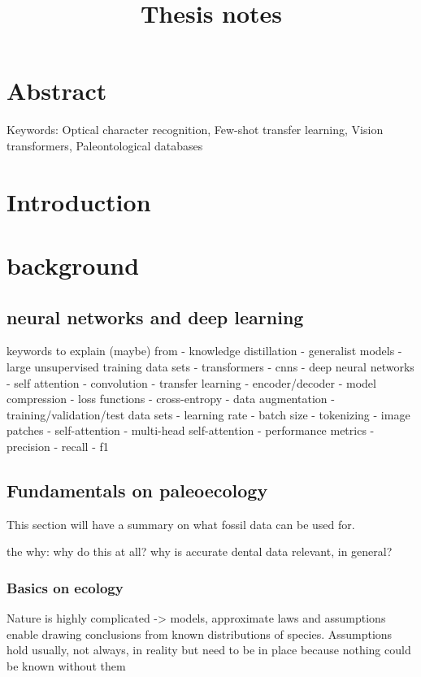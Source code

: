\documentclass{article}
\title{Thesis notes}
\begin{document}
\tableofcontents

\section{Abstract}

Keywords: Optical character recognition, Few-shot transfer learning, Vision transformers, Paleontological databases

\section{Introduction}

\section{background}

\subsection{neural networks and deep learning}
keywords to explain (maybe) from \cite{li2021trocr}
- knowledge distillation
- generalist models
	- large unsupervised training data sets
- transformers
- cnns
- deep neural networks
- self attention
- convolution
- transfer learning
- encoder/decoder
- model compression
- loss functions
	- cross-entropy 
- data augmentation
- training/validation/test data sets
- learning rate
- batch size
- tokenizing
- image patches
- self-attention
- multi-head self-attention
- performance metrics
	- precision
	- recall 
	- f1

\subsection{Fundamentals on paleoecology}

This section will have a summary on what fossil data can be used for.

the why: why do this at all? why is accurate dental data relevant, in general?

\subsubsection{Basics on ecology}

Nature is highly complicated -> models, approximate laws and assumptions enable drawing conclusions from
known distributions of species. Assumptions hold usually, not always, in reality but need to be in place 
because nothing could be known without them
\end{document}
